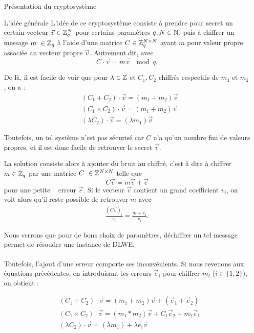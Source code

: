 \begin{section}{Présentation du cryptosystème}
	\begin{subsection}{L'idée générale}
	L'idée de ce cryptosystème consiste à prendre pour secret un certain vecteur $\vec{v} \in \mathbb{Z}_q^N$ pour certains paramètres $q, N \in \mathbb{N}$, puis à chiffrer un message $m \in \ZZq$ à l'aide d'une matrice $C \in \mathbb{Z}_q^{N \times N}$ ayant $m$ pour valeur propre associée au vecteur propre $\vec{v}$. Autrement dit, avec
\[C \cdot \vec{v} = m \vec{v}\: \mod q. \]

	De là, il est facile de voir que pour $\lambda \in \mathbb{Z}$ et  $C_1, C_2$ chiffrés respectifs de $m_1$ et $m_2$, on a :
	\begin{align*}
	& (C_1 + C_2) \cdot \vec{v} = (m_1 + m_2) \vec{v} \\
	& (C_1 \times C_2) \cdot \vec{v} = (m_1 + m_2) \vec{v} \\
	& (\lambda  C_2) \cdot \vec{v} = (\lambda m_1) \vec{v} 
	\end{align*}

	Toutefois, un tel système n'est pas sécurisé car $C$ n'a qu'un nombre fini de valeurs propres, et il est donc facile de retrouver le secret $\vec{v}$.

	La solution consiste alors à ajouter du bruit au chiffré, c'est à dire à chiffrer $m\in \ZZq$ par une matrice $C \in \ZZ^{N \times N}$ telle que 
	\[ C \vec{v} = m \vec{v} + \vec{e} \]
	pour une \og petite \fg~ erreur $\vec{e}$. Si le vecteur $\vec{v}$ contient un grand coefficient $v_i$, on voit alors qu'il reste possible de retrouver $m$ avec
	\begin{align*}
	\frac{{(C \vec{v})}_i}{v_i} = \frac{m + e_i}{v_i}.
	\end{align*}
	
	Nous verrons que pour de bons choix de paramètres, déchiffrer un tel message permet de résoudre une instance de
	DLWE.

\paragraph{}
	Toutefois, l'ajout d'une erreur comporte ses inconvénients. Si nous revenons aux équations précédentes, en introduisant les erreurs $\vec{e}_i$ pour chiffrer  $m_i$ ($i\in \{1,2\}$), on obtient :

	\begin{align*}
	& (C_1 + C_2) \cdot \vec{v} = (m_1 + m_2) \vec{v} + (\vec{e}_1 + \vec{e}_2)\\
	& (C_1 \times C_2) \cdot \vec{v} = (m_1 * m_2) \vec{v} + C_1 \vec{e}_2 + m_2\vec{e}_1 \\
	& (\lambda  C_2) \cdot \vec{v} = (\lambda m_1) + \lambda e_i\vec{v} 
	\end{align*}


\end{subsection}
\end{section}
